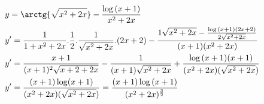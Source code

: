 \begin{ex}
\begin{align}
&y=\arctg{\sqrt{x^2+2x}}-\frac{\log{(x+1)}}{x^2+2x}\nonumber\\
&y'=\frac{1}{1+x^2+2x}.\frac{1}{2}.\frac{1}{\sqrt{x^2+2x}}.(2x+2)-\frac{1\sqrt{x^2+2x}-\frac{\log{(x+1)(2x+2)}}{2\sqrt{x^2+2x}}}{(x+1)(x^2+2x)}\nonumber\\
&y'=\frac{x+1}{(x+1)^2\sqrt{x+2+2x}}-\frac{1}{(x+1)\sqrt{x^2+2x}}+\frac{\log{(x+1)(x+1)}}{(x^2+2x)(\sqrt{x^2+2x})}\nonumber\\
&y'=\frac{(x+1)\log(x+1)}{(x^2+2x)(\sqrt{x^2+2x})}=\frac{(x+1)\log{(x+1)}}{(x^2+2x)^\frac{3}{2}}\nonumber
\end{align}
\end{ex}